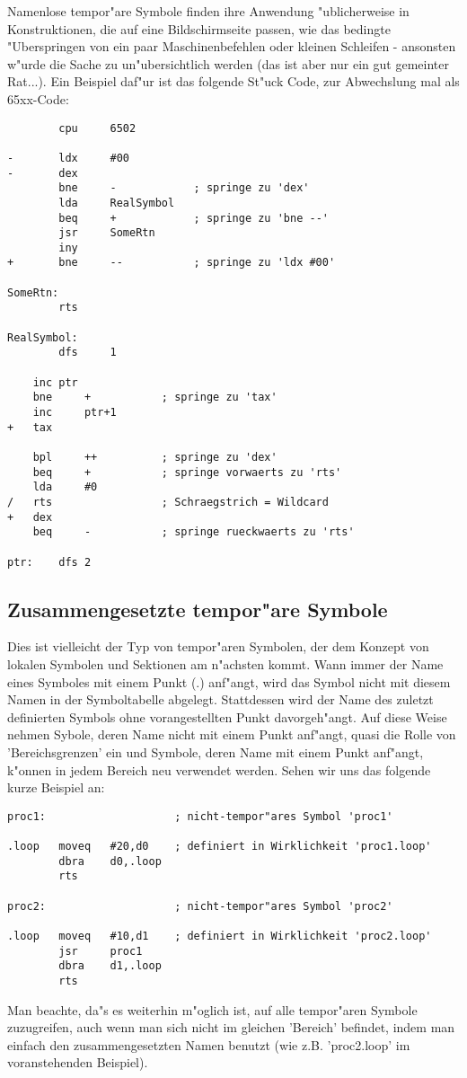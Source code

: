 \documentclass[12pt,a4paper,twoside]{report}
\begin{document}
Namenlose tempor"are Symbole finden ihre Anwendung "ublicherweise in
Konstruktionen, die auf eine Bildschirmseite passen, wie das bedingte
"Uberspringen von ein paar Maschinenbefehlen oder kleinen Schleifen -
ansonsten w"urde die Sache zu un"ubersichtlich werden (das ist aber nur
ein gut gemeinter Rat...).  Ein Beispiel daf"ur ist das folgende St"uck
Code, zur Abwechslung mal als 65xx-Code:
\begin{verbatim}
        cpu     6502

-       ldx     #00
-       dex
        bne     -            ; springe zu 'dex'
        lda     RealSymbol
        beq     +            ; springe zu 'bne --'
        jsr     SomeRtn
        iny
+       bne     --           ; springe zu 'ldx #00'

SomeRtn:
        rts

RealSymbol:
        dfs     1

  	inc	ptr
   	bne 	+      	    ; springe zu 'tax'
   	inc 	ptr+1
+ 	tax

 	bpl 	++     	    ; springe zu 'dex'
   	beq 	+      	    ; springe vorwaerts zu 'rts'
   	lda 	#0
/  	rts            	    ; Schraegstrich = Wildcard
+ 	dex
   	beq 	-           ; springe rueckwaerts zu 'rts'

ptr:	dfs	2
\end{verbatim}

\subsection{Zusammengesetzte tempor"are Symbole}

Dies ist vielleicht der Typ von tempor"aren Symbolen, der dem Konzept von
lokalen Symbolen und Sektionen am n"achsten kommt.  Wann immer der Name
eines Symboles mit einem Punkt (.) anf"angt, wird das Symbol nicht mit
diesem Namen in der Symboltabelle abgelegt.  Stattdessen wird der Name des
zuletzt definierten Symbols ohne vorangestellten Punkt davorgeh"angt.  Auf
diese Weise nehmen Sybole, deren Name nicht mit einem Punkt anf"angt, quasi
die Rolle von 'Bereichsgrenzen' ein und Symbole, deren Name mit einem
Punkt anf"angt, k"onnen in jedem Bereich neu verwendet werden.  Sehen wir
uns das folgende kurze Beispiel an:
\begin{verbatim}
proc1:                    ; nicht-tempor"ares Symbol 'proc1'

.loop   moveq   #20,d0    ; definiert in Wirklichkeit 'proc1.loop'
        dbra    d0,.loop
        rts

proc2:                    ; nicht-tempor"ares Symbol 'proc2'

.loop   moveq   #10,d1    ; definiert in Wirklichkeit 'proc2.loop'
        jsr     proc1
        dbra    d1,.loop
        rts
\end{verbatim}
Man beachte, da"s es weiterhin m"oglich ist, auf alle tempor"aren Symbole
zuzugreifen, auch wenn man sich nicht im gleichen 'Bereich' befindet,
indem man einfach den zusammengesetzten Namen benutzt (wie z.B.
'proc2.loop' im voranstehenden Beispiel).
\end{document}
